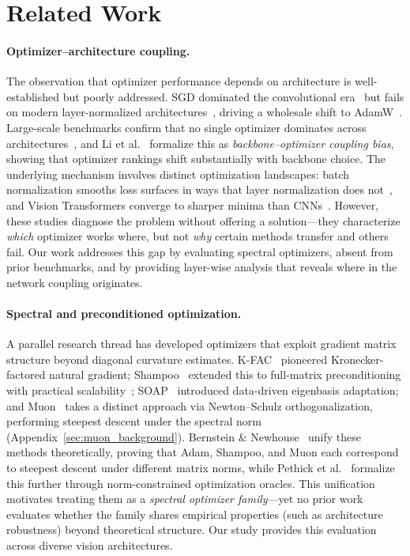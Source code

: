 \section{Related Work}
\label{sec:related_work}

\paragraph{Optimizer--architecture coupling.}
The observation that optimizer performance depends on architecture is well-established but poorly addressed. SGD dominated the convolutional era~\cite{he2016deep} but fails on modern layer-normalized architectures~\cite{liu2022convnet,touvron2021training}, driving a wholesale shift to AdamW~\cite{loshchilov2019decoupled}. Large-scale benchmarks confirm that no single optimizer dominates across architectures~\cite{choi2020optimizers,schmidt2021crowdedvalley,dahl2024benchmarking}, and Li et al.~\cite{li2024bocb} formalize this as \emph{backbone--optimizer coupling bias}, showing that optimizer rankings shift substantially with backbone choice. The underlying mechanism involves distinct optimization landscapes: batch normalization smooths loss surfaces in ways that layer normalization does not~\cite{santurkar2018how}, and Vision Transformers converge to sharper minima than CNNs~\cite{chen2022vit}. However, these studies diagnose the problem without offering a solution---they characterize \emph{which} optimizer works where, but not \emph{why} certain methods transfer and others fail. Our work addresses this gap by evaluating spectral optimizers, absent from prior benchmarks, and by providing layer-wise analysis that reveals where in the network coupling originates.

\paragraph{Spectral and preconditioned optimization.}
A parallel research thread has developed optimizers that exploit gradient matrix structure beyond diagonal curvature estimates. K-FAC~\cite{martens2015kfac} pioneered Kronecker-factored natural gradient; Shampoo~\cite{gupta2018shampoo,anil2020scalable} extended this to full-matrix preconditioning with practical scalability~\citep{shi2023distributed}; SOAP~\cite{vyas2024soap} introduced data-driven eigenbasis adaptation; and Muon~\cite{jordan2024muon} takes a distinct approach via Newton--Schulz orthogonalization, performing steepest descent under the spectral norm (Appendix~\ref{sec:muon_background}). Bernstein \& Newhouse~\cite{bernstein2024old} unify these methods theoretically, proving that Adam, Shampoo, and Muon each correspond to steepest descent under different matrix norms, while Pethick et al.~\cite{pethick2025training} formalize this further through norm-constrained optimization oracles. This unification motivates treating them as a \emph{spectral optimizer family}---yet no prior work evaluates whether the family shares empirical properties (such as architecture robustness) beyond theoretical structure. Our study provides this evaluation across diverse vision architectures.

